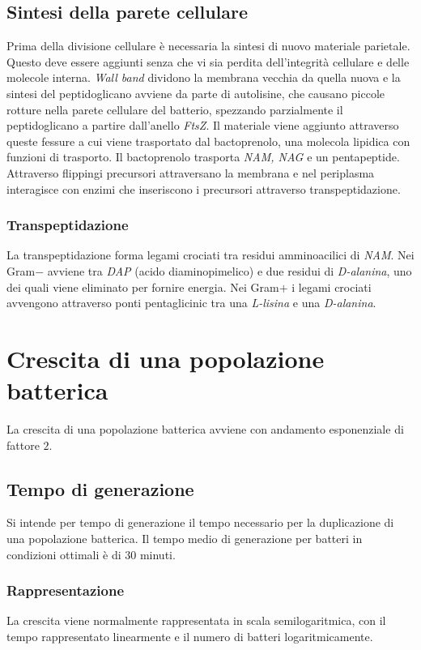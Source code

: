 	\subsection{Sintesi della parete cellulare}
	Prima della divisione cellulare \`e necessaria la sintesi di nuovo materiale parietale.
	Questo deve essere aggiunti senza che vi sia perdita dell'integrit\`a cellulare e delle molecole interna.
	\emph{Wall band} dividono la membrana vecchia da quella nuova e la sintesi del peptidoglicano avviene da parte di autolisine, che causano piccole rotture nella parete cellulare del batterio, spezzando parzialmente il peptidoglicano a partire dall'anello \emph{FtsZ}.
	Il materiale viene aggiunto attraverso queste fessure a cui viene trasportato dal bactoprenolo, una molecola lipidica con funzioni di trasporto.
	Il bactoprenolo trasporta \emph{NAM, NAG} e un pentapeptide.
	Attraverso flippingi precursori attraversano la membrana e nel periplasma interagisce con enzimi che inseriscono i precursori attraverso transpeptidazione.

		\subsubsection{Transpeptidazione}
		La transpeptidazione forma legami crociati tra residui amminoacilici di \emph{NAM}.
		Nei Gram$-$ avviene tra \emph{DAP} (acido diaminopimelico) e due residui di \emph{D-alanina},  uno dei quali viene eliminato per fornire energia.
		Nei Gram$+$ i legami crociati avvengono attraverso ponti pentaglicinic tra una \emph{L-lisina} e una \emph{D-alanina}.

\section{Crescita di una popolazione batterica}
La crescita di una popolazione batterica avviene con andamento esponenziale di fattore $2$.

	\subsection{Tempo di generazione}
	Si intende per tempo di generazione il tempo necessario per la duplicazione di una popolazione batterica.
	Il tempo medio di generazione per batteri in condizioni ottimali \`e di $30$ minuti.

		\subsubsection{Rappresentazione}
		La crescita viene normalmente rappresentata in scala semilogaritmica, con il tempo rappresentato linearmente e il numero di batteri logaritmicamente.

